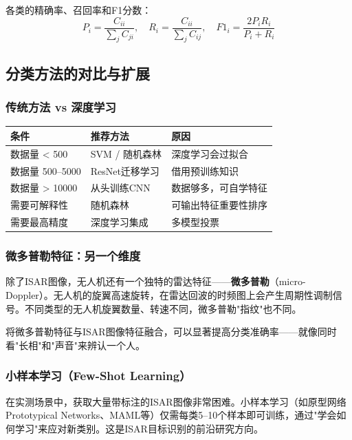 \documentclass[12pt, a4paper]{article}
\begin{document}
各类的精确率、召回率和F1分数：
\begin{equation}
P_i = \frac{C_{ii}}{\sum_j C_{ji}}, \quad R_i = \frac{C_{ii}}{\sum_j C_{ij}}, \quad F1_i = \frac{2P_i R_i}{P_i + R_i}
\end{equation}

\subsection{分类方法的对比与扩展}

\subsubsection{传统方法 vs 深度学习}

\begin{keybox}
\begin{tabular}{lll}
\toprule
条件 & 推荐方法 & 原因 \\
\midrule
数据量 < 500 & SVM / 随机森林 & 深度学习会过拟合 \\
数据量 500--5000 & ResNet迁移学习 & 借用预训练知识 \\
数据量 > 10000 & 从头训练CNN & 数据够多，可自学特征 \\
需要可解释性 & 随机森林 & 可输出特征重要性排序 \\
需要最高精度 & 深度学习集成 & 多模型投票 \\
\bottomrule
\end{tabular}
\end{keybox}

\subsubsection{微多普勒特征：另一个维度}

除了ISAR图像，无人机还有一个独特的雷达特征——\textbf{微多普勒}（micro-Doppler）。无人机的旋翼高速旋转，在雷达回波的时频图上会产生周期性调制信号。不同类型的无人机旋翼数量、转速不同，微多普勒"指纹"也不同。

将微多普勒特征与ISAR图像特征融合，可以显著提高分类准确率——就像同时看"长相"和"声音"来辨认一个人。

\subsubsection{小样本学习（Few-Shot Learning）}

在实测场景中，获取大量带标注的ISAR图像非常困难。小样本学习（如原型网络Prototypical Networks、MAML等）仅需每类5--10个样本即可训练，通过"学会如何学习"来应对新类别。这是ISAR目标识别的前沿研究方向。
\end{document}
